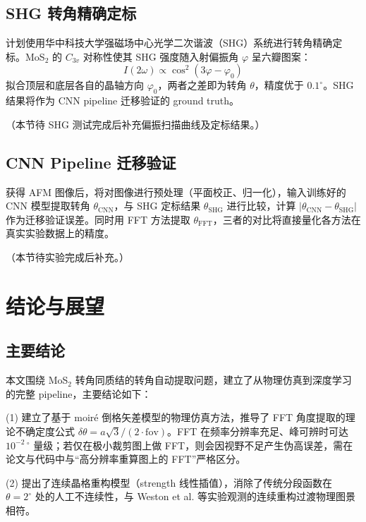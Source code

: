 \documentclass[supercite]{HustGraduPaper}
\begin{document}
\subsection{SHG 转角精确定标}

计划使用华中科技大学强磁场中心光学二次谐波（SHG）系统进行转角精确定标。MoS$_2$ 的 $C_{3v}$ 对称性使其 SHG 强度随入射偏振角 $\varphi$ 呈六瓣图案：
\begin{equation}
  I(2\omega) \propto \cos^2(3\varphi - \varphi_0)
\end{equation}
拟合顶层和底层各自的晶轴方向 $\varphi_0$，两者之差即为转角 $\theta$，精度优于 $0.1^{\circ}$。SHG 结果将作为 CNN pipeline 迁移验证的 ground truth。

（本节待 SHG 测试完成后补充偏振扫描曲线及定标结果。）

\subsection{CNN Pipeline 迁移验证}

获得 AFM 图像后，将对图像进行预处理（平面校正、归一化），输入训练好的 CNN 模型提取转角 $\theta_\mathrm{CNN}$，与 SHG 定标结果 $\theta_\mathrm{SHG}$ 进行比较，计算 $|\theta_\mathrm{CNN} - \theta_\mathrm{SHG}|$ 作为迁移验证误差。同时用 FFT 方法提取 $\theta_\mathrm{FFT}$，三者的对比将直接量化各方法在真实实验数据上的精度。

（本节待实验完成后补充。）

\section{结论与展望}

\subsection{主要结论}

本文围绕 MoS$_2$ 转角同质结的转角自动提取问题，建立了从物理仿真到深度学习的完整 pipeline，主要结论如下：

(1) 建立了基于 moiré 倒格矢差模型的物理仿真方法，推导了 FFT 角度提取的理论不确定度公式 $\delta\theta = a\sqrt{3}/(2\cdot\mathrm{fov})$。FFT 在频率分辨率充足、峰可辨时可达 $10^{-2}\,^{\circ}$ 量级；若仅在极小裁剪图上做 FFT，则会因视野不足产生伪高误差，需在论文与代码中与``高分辨率重算图上的 FFT''严格区分。

(2) 提出了连续晶格重构模型（strength 线性插值），消除了传统分段函数在 $\theta = 2^{\circ}$ 处的人工不连续性，与 Weston et al. 等实验观测的连续重构过渡物理图景相符\cite{weston2020atomic}。
\end{document}

